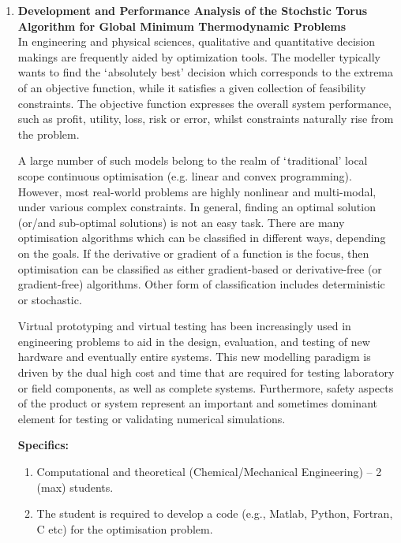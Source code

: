 \documentclass[12pts,a4paper,amsmath,amssymb,floatfix]{article}%
\begin{document}
\begin{enumerate}[label=\bfseries Project \arabic*:]
\clearpage

\item {\bf Development and Performance Analysis of the Stochstic Torus Algorithm for Global Minimum Thermodynamic Problems} \\

In engineering and physical sciences, qualitative and quantitative decision makings are frequently aided by optimization tools. The modeller typically wants to find the $\lq$absolutely best’ decision which corresponds to the extrema of an objective function, while it satisfies a given collection of feasibility constraints. The objective function expresses the overall system performance, such as profit, utility, loss, risk or error, whilst constraints naturally rise from the problem.

A large number of such models belong to the realm of $\lq$traditional' local scope continuous optimisation (e.g. linear and convex programming). However, most real-world problems are highly nonlinear and multi-modal, under various complex constraints. In general, finding an optimal solution (or/and sub-optimal solutions) is not an easy task. There are many optimisation algorithms which can be classified in different ways, depending on the goals. If the derivative or gradient of a function is the focus, then optimisation can be classified as either gradient-based or derivative-free (or gradient-free) algorithms. Other form of classification includes deterministic or stochastic.

Virtual prototyping and virtual testing has been increasingly used in engineering problems to aid in the design, evaluation, and testing of new hardware and eventually entire systems. This new modelling paradigm is driven by the dual high cost and time that are required for testing laboratory or field components, as well as complete systems. Furthermore, safety aspects of the product or system represent an important and sometimes dominant element for testing or validating numerical simulations.

\noindent
{\bf Specifics:} 
\begin{enumerate}
\item Computational and theoretical (Chemical/Mechanical Engineering) -- 2 (max) students. 
\item The student is required to develop a code (e.g., Matlab, Python, Fortran, C etc) for the optimisation problem.
\end{enumerate} 


\end{enumerate}
\end{document}
